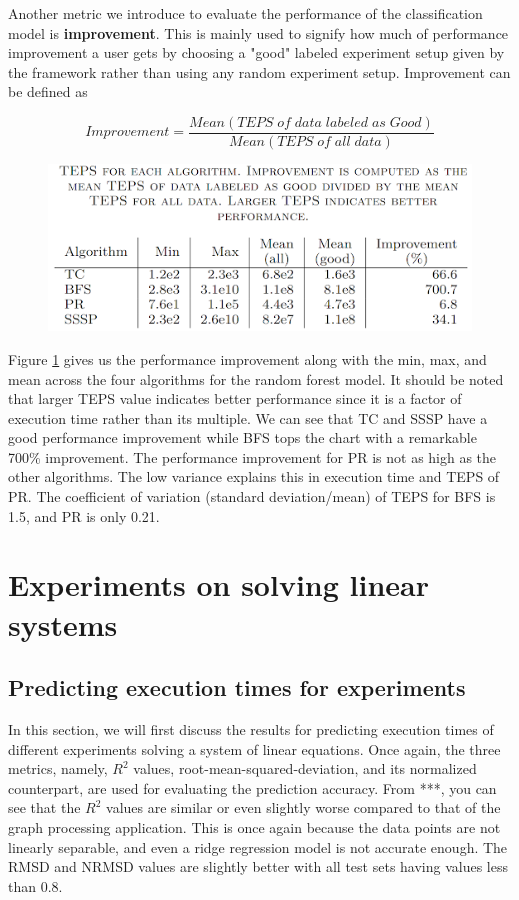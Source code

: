 Another metric we introduce to evaluate the performance of the classification model is \textbf{improvement}. This is mainly used to signify how much of performance improvement a user gets by choosing a "good" labeled experiment setup given by the framework rather than using any random experiment setup. Improvement can be defined as


\[
Improvement=  \frac{Mean(TEPS\;of\;data\;labeled\;as\;Good)}{Mean(TEPS\;of\;all\;data)}
\]
\vspace{4 pt}


\begin{figure}
    \centering
    \includegraphics[width=1\columnwidth]{figures/classification_improvement.png}
    \caption{}
    \label{Improvement}
\end{figure}

Figure \ref{Improvement} gives us the performance improvement along with the min, max, and mean across the four algorithms for the random forest model. It should be noted that larger TEPS value indicates better performance since it is a factor of execution time rather than its multiple. We can see that TC and SSSP have a good performance improvement while BFS tops the chart with a remarkable 700\% improvement. The performance improvement for PR is not as high as the other algorithms. The low variance explains this in execution time and TEPS of PR. The coefficient of variation (standard deviation/mean) of TEPS for BFS is 1.5, and PR is only 0.21. 

\section{Experiments on solving linear systems}
\subsection{Predicting execution times for experiments}
In this section, we will first discuss the results for predicting execution times of different experiments solving a system of linear equations. Once again, the three metrics, namely, $R^2$ values, root-mean-squared-deviation, and its normalized counterpart, are used for evaluating the prediction accuracy. From ***, you can see that the $R^2$ values are similar or even slightly worse compared to that of the graph processing application. This is once again because the data points are not linearly separable, and even a ridge regression model is not accurate enough. The RMSD and NRMSD values are slightly better with all test sets having values less than 0.8. 

